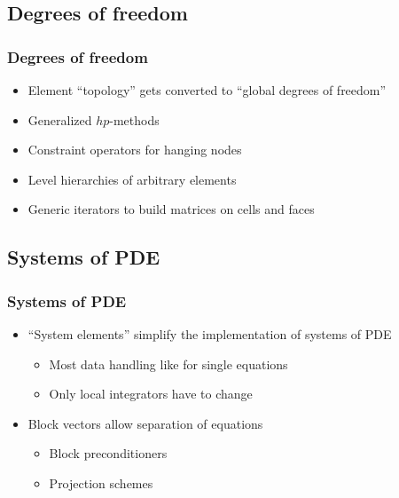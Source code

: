 \subsection{Degrees of freedom}
\begin{frame}
  \frametitle{Degrees of freedom}
  \begin{itemize}
  \item Element ``topology'' gets converted to ``global degrees
    of freedom''
  \item Generalized $hp$-methods
  \item Constraint operators for hanging nodes
  \item Level hierarchies of arbitrary elements
  \item Generic iterators to build matrices on cells and faces
  \end{itemize}
\end{frame}

\subsection{Systems of PDE}
\begin{frame}
  \frametitle{Systems of PDE}
  \begin{itemize}
  \item ``System elements'' simplify the implementation of systems of
    PDE
    \begin{itemize}
    \item Most data handling like for single equations
    \item Only local integrators have to change
    \end{itemize}
  \item Block vectors allow separation of equations
    \begin{itemize}
    \item Block preconditioners
    \item Projection schemes
    \end{itemize}
  \end{itemize}
\end{frame}

